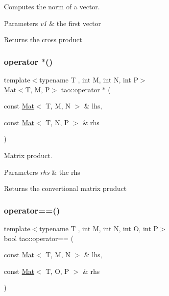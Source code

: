 Computes the norm of a vector. 


\begin{DoxyParams}{Parameters}
{\em v1} & the first vector \\
\hline
\end{DoxyParams}
\begin{DoxyReturn}{Returns}
the cross product 
\end{DoxyReturn}
\mbox{\label{namespacetao_a8ed9b8556b4fa9f623903552fe9240de}} 
\subsubsection{\texorpdfstring{operator $\ast$()}{operator *()}}
{\footnotesize\ttfamily template$<$typename T , int M, int N, int P$>$ \\
\mbox{\hyperlink{classtao_1_1_mat}{Mat}}$<$T, M, P$>$ tao\+::operator $\ast$ (\begin{DoxyParamCaption}\item[{const \mbox{\hyperlink{classtao_1_1_mat}{Mat}}$<$ T, M, N $>$ \&}]{lhs,  }\item[{const \mbox{\hyperlink{classtao_1_1_mat}{Mat}}$<$ T, N, P $>$ \&}]{rhs }\end{DoxyParamCaption})}



Matrix product. 


\begin{DoxyParams}{Parameters}
{\em rhs} & the rhs \\
\hline
\end{DoxyParams}
\begin{DoxyReturn}{Returns}
the convertional matrix pruduct 
\end{DoxyReturn}
\mbox{\label{namespacetao_a00596468f8e90608840017e4619e0bb7}} 
\subsubsection{\texorpdfstring{operator==()}{operator==()}}
{\footnotesize\ttfamily template$<$typename T , int M, int N, int O, int P$>$ \\
bool tao\+::operator== (\begin{DoxyParamCaption}\item[{const \mbox{\hyperlink{classtao_1_1_mat}{Mat}}$<$ T, M, N $>$ \&}]{lhs,  }\item[{const \mbox{\hyperlink{classtao_1_1_mat}{Mat}}$<$ T, O, P $>$ \&}]{rhs }\end{DoxyParamCaption})}



